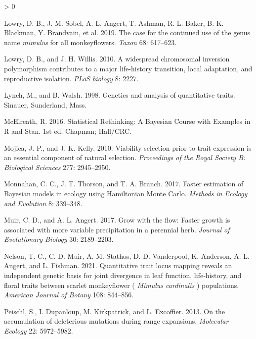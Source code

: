 \documentclass[
  12pt,
]{article}
\newlength{\cslhangindent}
\newenvironment{CSLReferences}[2] %
 {%
  \setlength{\parindent}{0pt}
  \ifodd #1 \everypar{\setlength{\hangindent}{\cslhangindent}}\ignorespaces\fi
  \ifnum #2 > 0
  \setlength{\parskip}{#2\baselineskip}
  \fi
 }%
 {}
\begin{document}
\begin{CSLReferences}{1}{0}
\leavevmode\hypertarget{ref-lowry_case_2019}{}%
Lowry, D. B., J. M. Sobel, A. L. Angert, T. Ashman, R. L. Baker, B. K. Blackman, Y. Brandvain, et al. 2019. The case for the continued use of the genus name \emph{mimulus} for all monkeyflowers. \emph{Taxon} 68: 617--623.

\leavevmode\hypertarget{ref-lowry_widespread_2010}{}%
Lowry, D. B., and J. H. Willis. 2010. A widespread chromosomal inversion polymorphism contributes to a major life-history transition, local adaptation, and reproductive isolation. \emph{PLoS biology} 8: 2227.

\leavevmode\hypertarget{ref-lynch_genetics_1998}{}%
Lynch, M., and B. Walsh. 1998. Genetics and analysis of quantitative traits. Sinauer, Sunderland, Mass.

\leavevmode\hypertarget{ref-mcelreath_statistical_2016}{}%
McElreath, R. 2016. Statistical {Rethinking}: {A} {Bayesian} {Course} with {Examples} in {R} and {Stan}. 1st ed. Chapman; Hall/CRC.

\leavevmode\hypertarget{ref-mojica_viability_2010}{}%
Mojica, J. P., and J. K. Kelly. 2010. Viability selection prior to trait expression is an essential component of natural selection. \emph{Proceedings of the Royal Society B: Biological Sciences} 277: 2945--2950.

\leavevmode\hypertarget{ref-monnahan_faster_2017}{}%
Monnahan, C. C., J. T. Thorson, and T. A. Branch. 2017. Faster estimation of {Bayesian} models in ecology using {Hamiltonian} {Monte} {Carlo}. \emph{Methods in Ecology and Evolution} 8: 339--348.

\leavevmode\hypertarget{ref-muir_grow_2017}{}%
Muir, C. D., and A. L. Angert. 2017. Grow with the flow: Faster growth is associated with more variable precipitation in a perennial herb. \emph{Journal of Evolutionary Biology} 30: 2189--2203.

\leavevmode\hypertarget{ref-nelson_quantitative_2021}{}%
Nelson, T. C., C. D. Muir, A. M. Stathos, D. D. Vanderpool, K. Anderson, A. L. Angert, and L. Fishman. 2021. Quantitative trait locus mapping reveals an independent genetic basis for joint divergence in leaf function, life‐history, and floral traits between scarlet monkeyflower ( \emph{{Mimulus} cardinalis} ) populations. \emph{American Journal of Botany} 108: 844--856.

\leavevmode\hypertarget{ref-peischl_accumulation_2013}{}%
Peischl, S., I. Dupanloup, M. Kirkpatrick, and L. Excoffier. 2013. On the accumulation of deleterious mutations during range expansions. \emph{Molecular Ecology} 22: 5972--5982.


\end{CSLReferences}
\end{document}
